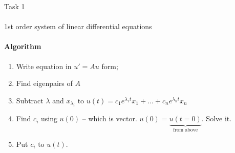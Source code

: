 \documentclass[aspectratio=169]{beamer}
\begin{document}
\begin{frame}[t]{Task 1}
    \framesubtitle{}
    \vspace{-0.3cm}
\end{frame}

\begin{frame}[t]{1st order system of linear differential equations}
\framesubtitle{Algorithm}
\Large
\begin{enumerate}
    \item Write equation in $u' = Au$ form;
    \item Find eigenpairs of $A$
    \item Subtract $\lambda$ and $x_{\lambda_i}$ to $u(t)=c_1e^{\lambda_1 t}x_1 + ... + c_ne^{\lambda_n t}x_n$
    \item Find $c_i$ using $u(0)$ -- which is vector. $u(0) = \underbrace{u(t=0)}_{\text{from above}}$. Solve it.
    \item Put $c_i$ to $u(t)$.  
\end{enumerate}
\end{frame}
\end{document}
